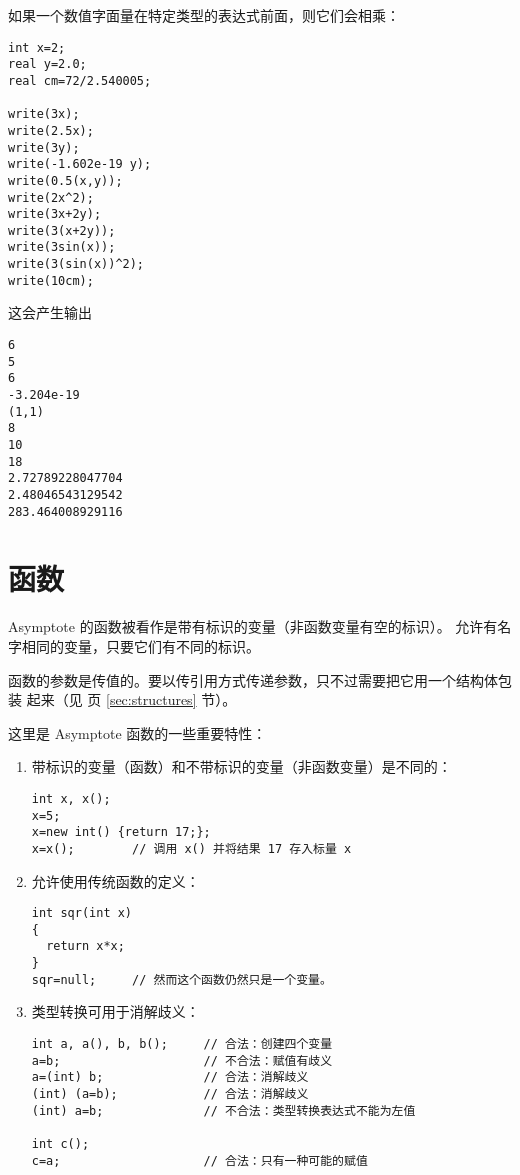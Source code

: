\documentclass[nofonts,CJKnormalspaces]{ctexbook}[2009/05/20]
\newcommand*\prgname[1]{\textsf{#1}}
\begin{document}
{{{如果一个数值字面量在特定类型的表达式前面，则它们会相乘：
\begin{lstlisting}
int x=2;
real y=2.0;
real cm=72/2.540005;

write(3x);
write(2.5x);
write(3y);
write(-1.602e-19 y);
write(0.5(x,y));
write(2x^2);
write(3x+2y);
write(3(x+2y));
write(3sin(x));
write(3(sin(x))^2);
write(10cm);
\end{lstlisting}

这会产生输出
\begin{lstlisting}
6
5
6
-3.204e-19
(1,1)
8
10
18
2.72789228047704
2.48046543129542
283.464008929116
\end{lstlisting}


\section{函数}
\label{sec:functions}

\prgname{Asymptote} 的函数被看作是带有标识的变量（非函数变量有空的标识）。
允许有名字相同的变量，只要它们有不同的标识。

函数的参数是传值的。要以传引用方式传递参数，只不过需要把它用一个结构体包装
起来（见 \pageref{sec:structures} 页 \ref{sec:structures} 节）。

这里是 \prgname{Asymptote} 函数的一些重要特性：
\begin{enumerate}
\item 带标识的变量（函数）和不带标识的变量（非函数变量）是不同的：
\begin{lstlisting}
int x, x();
x=5;
x=new int() {return 17;};
x=x();        // 调用 x() 并将结果 17 存入标量 x
\end{lstlisting}

\item 允许使用传统函数的定义：
\begin{lstlisting}
int sqr(int x)
{
  return x*x;
}
sqr=null;     // 然而这个函数仍然只是一个变量。
\end{lstlisting}

\item 类型转换可用于消解歧义：
\begin{lstlisting}
int a, a(), b, b();     // 合法：创建四个变量
a=b;                    // 不合法：赋值有歧义
a=(int) b;              // 合法：消解歧义
(int) (a=b);            // 合法：消解歧义
(int) a=b;              // 不合法：类型转换表达式不能为左值

int c();
c=a;                    // 合法：只有一种可能的赋值
\end{lstlisting}


\end{enumerate}}}}
\end{document}
